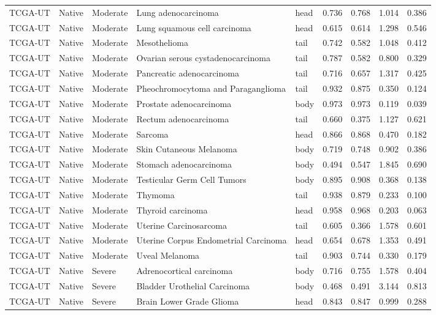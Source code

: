 \begin{longtable}{lllllrrrr}
TCGA-UT & Native & Moderate & Lung adenocarcinoma & head & 0.736 & 0.768 & 1.014 & 0.386 \\
TCGA-UT & Native & Moderate & Lung squamous cell carcinoma & head & 0.615 & 0.614 & 1.298 & 0.546 \\
TCGA-UT & Native & Moderate & Mesothelioma & tail & 0.742 & 0.582 & 1.048 & 0.412 \\
TCGA-UT & Native & Moderate & Ovarian serous cystadenocarcinoma & tail & 0.787 & 0.582 & 0.800 & 0.329 \\
TCGA-UT & Native & Moderate & Pancreatic adenocarcinoma & tail & 0.716 & 0.657 & 1.317 & 0.425 \\
TCGA-UT & Native & Moderate & Pheochromocytoma and Paraganglioma & tail & 0.932 & 0.875 & 0.350 & 0.124 \\
TCGA-UT & Native & Moderate & Prostate adenocarcinoma & body & 0.973 & 0.973 & 0.119 & 0.039 \\
TCGA-UT & Native & Moderate & Rectum adenocarcinoma & tail & 0.660 & 0.375 & 1.127 & 0.621 \\
TCGA-UT & Native & Moderate & Sarcoma & head & 0.866 & 0.868 & 0.470 & 0.182 \\
TCGA-UT & Native & Moderate & Skin Cutaneous Melanoma & body & 0.719 & 0.748 & 0.902 & 0.386 \\
TCGA-UT & Native & Moderate & Stomach adenocarcinoma & body & 0.494 & 0.547 & 1.845 & 0.690 \\
TCGA-UT & Native & Moderate & Testicular Germ Cell Tumors & body & 0.895 & 0.908 & 0.368 & 0.138 \\
TCGA-UT & Native & Moderate & Thymoma & tail & 0.938 & 0.879 & 0.233 & 0.100 \\
TCGA-UT & Native & Moderate & Thyroid carcinoma & head & 0.958 & 0.968 & 0.203 & 0.063 \\
TCGA-UT & Native & Moderate & Uterine Carcinosarcoma & tail & 0.605 & 0.366 & 1.578 & 0.601 \\
TCGA-UT & Native & Moderate & Uterine Corpus Endometrial Carcinoma & head & 0.654 & 0.678 & 1.353 & 0.491 \\
TCGA-UT & Native & Moderate & Uveal Melanoma & tail & 0.903 & 0.744 & 0.330 & 0.179 \\
TCGA-UT & Native & Severe & Adrenocortical carcinoma & body & 0.716 & 0.755 & 1.578 & 0.404 \\
TCGA-UT & Native & Severe & Bladder Urothelial Carcinoma & body & 0.468 & 0.491 & 3.144 & 0.813 \\
TCGA-UT & Native & Severe & Brain Lower Grade Glioma & head & 0.843 & 0.847 & 0.999 & 0.288 \\

\end{longtable}
